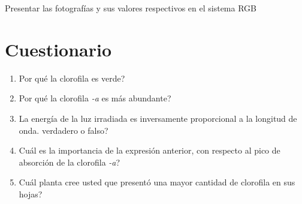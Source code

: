Presentar las fotograf\'ias y sus valores respectivos en el sistema RGB

\section{Cuestionario}

\begin{enumerate}
	\item \textquestiondown Por qu\'e la clorofila es verde?
	\item \textquestiondown Por qu\'e la clorofila \textit{-a} es m\'as abundante?
	\item La energ\'ia de la luz irradiada es inversamente proporcional a la longitud de onda. \textquestiondown verdadero o falso?
	\item \textquestiondown Cu\'al es la importancia de la expresi\'on anterior, con respecto al pico de absorción de la  clorofila \textit{-a}?
	\item \textquestiondown Cu\'al planta cree usted que present\'o una mayor cantidad de clorofila en sus hojas?
\end{enumerate}


